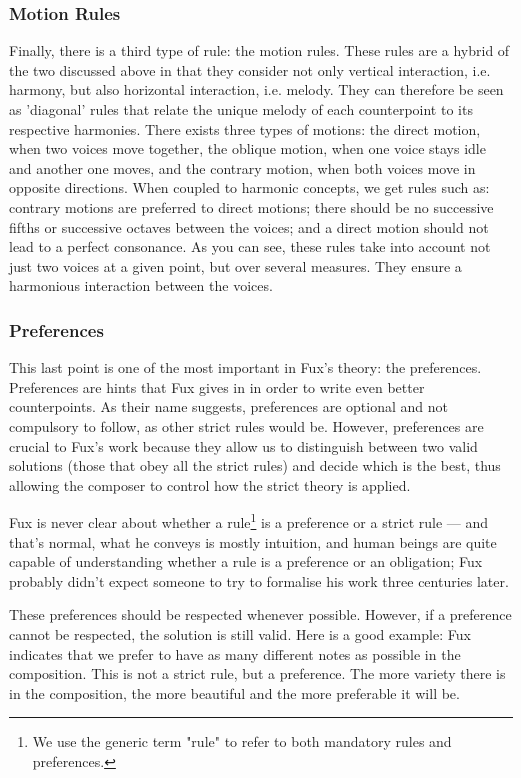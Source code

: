 \subsubsection{Motion Rules}
Finally, there is a third type of rule: the motion rules. These rules are a hybrid of the two discussed above in that they consider not only vertical interaction, i.e. harmony, but also horizontal interaction, i.e. melody. They can therefore be seen as 'diagonal' rules that relate the unique melody of each counterpoint to its respective harmonies. There exists three types of motions: the direct motion, when two voices move together, the oblique motion, when one voice stays idle and another one moves, and the contrary motion, when both voices move in opposite directions. When coupled to harmonic concepts, we get rules such as: contrary motions are preferred to direct motions; there should be no successive fifths or successive octaves between the voices; and a direct motion should not lead to a perfect consonance. As you can see, these rules take into account not just two voices at a given point, but over several measures. They ensure a harmonious interaction between the voices.

\subsubsection{Preferences}\label{subsection:preferences-vs-hard-rules}
This last point is one of the most important in Fux's theory: the preferences. Preferences are hints that Fux gives in \gaps in order to write even better counterpoints. As their name suggests, preferences are optional and not compulsory to follow, as other strict rules would be. However, preferences are crucial to Fux's work because they allow us to distinguish between two valid solutions (those that obey all the strict rules) and decide which is the best, thus allowing the composer to control how the strict theory is applied.

Fux is never clear about whether a rule\footnote{We use the generic term "rule" to refer to both mandatory rules and preferences.} is a preference or a strict rule --- and that's normal, what he conveys is mostly intuition, and human beings are quite capable of understanding whether a rule is a preference or an obligation; Fux probably didn't expect someone to try to formalise his work three centuries later.

These preferences should be respected whenever possible. However, if a preference cannot be respected, the solution is still valid. Here is a good example: Fux indicates that we prefer to have as many different notes as possible in the composition. This is not a strict rule, but a preference. The more variety there is in the composition, the more beautiful and the more preferable it will be.

